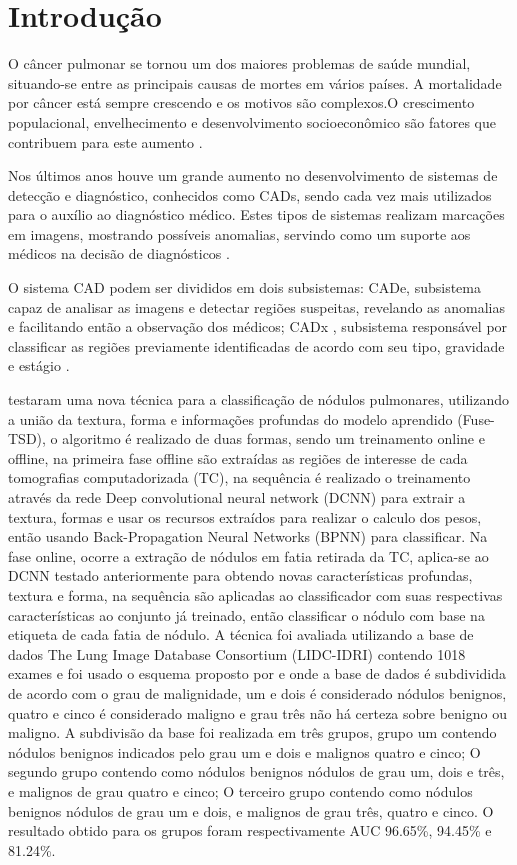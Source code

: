 \chapter{Introdução}
\label{cap:01}


O câncer pulmonar se tornou um dos maiores problemas de saúde mundial, situando-se entre as principais causas de mortes em vários países. A mortalidade por câncer está sempre crescendo e os motivos são complexos.O crescimento populacional, envelhecimento e desenvolvimento socioeconômico são fatores que contribuem para este aumento \cite{teste5}.

Nos últimos anos houve um grande aumento no desenvolvimento de sistemas de detecção e diagnóstico, conhecidos como CADs, sendo cada vez mais utilizados para o auxílio ao diagnóstico médico. Estes tipos de sistemas realizam marcações em imagens, mostrando possíveis anomalias, servindo como um suporte aos médicos na decisão de diagnósticos \cite{teste6}.

O sistema CAD podem ser divididos em dois subsistemas: CADe, subsistema capaz de analisar as imagens e detectar regiões suspeitas, revelando as anomalias e facilitando então a observação dos médicos; CADx , subsistema responsável por classificar as regiões previamente identificadas de acordo com seu tipo, gravidade e estágio \cite{VALENTE201691}.

 testaram uma nova técnica para a classificação de nódulos pulmonares, utilizando a união da textura, forma e informações profundas do modelo aprendido (Fuse-TSD), o algoritmo é realizado de duas formas, sendo um treinamento online e offline, na primeira fase offline são extraídas as regiões de interesse de cada tomografias computadorizada (TC), na sequência é realizado o treinamento através da rede Deep convolutional neural network (DCNN) para extrair a textura, formas e usar os recursos extraídos para realizar o calculo dos pesos, então usando Back-Propagation Neural Networks (BPNN) para classificar. Na fase online, ocorre a extração de nódulos em fatia retirada da TC, aplica-se ao DCNN testado anteriormente para obtendo novas características profundas, textura e forma, na sequência são aplicadas ao classificador com suas respectivas características ao conjunto já treinado, então classificar o nódulo com base na etiqueta de cada fatia de nódulo. A técnica foi avaliada utilizando a base de dados The Lung Image Database Consortium (LIDC-IDRI) contendo 1018 exames e foi usado o esquema proposto por  e  onde a base de dados é subdividida de acordo com o grau de malignidade, um e dois é considerado nódulos benignos, quatro e cinco é considerado maligno e grau três não há certeza sobre benigno ou maligno. A subdivisão da base foi realizada em três grupos, grupo um contendo nódulos benignos indicados pelo grau um e dois e malignos quatro e cinco; O segundo grupo contendo como nódulos benignos nódulos de grau um, dois e três, e malignos de grau quatro e cinco; O terceiro grupo contendo como nódulos benignos nódulos de grau um e dois, e malignos de grau três, quatro e cinco. O resultado obtido para os grupos foram respectivamente AUC 96.65\%, 94.45\% e 81.24\%.

